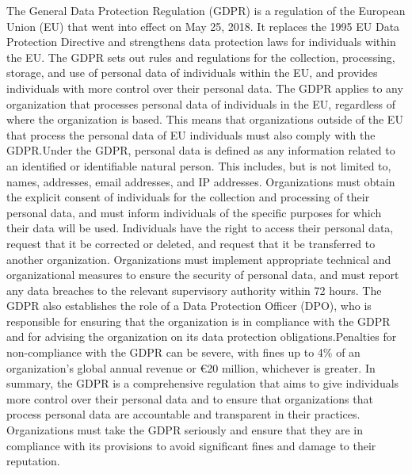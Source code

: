\documentclass[target=mst,aauheader=]{thud}
\begin{document}
The General Data Protection Regulation (GDPR) is a regulation of the European Union (EU) that went into effect on May 25, 2018. It replaces the 1995 EU Data Protection Directive and strengthens data protection laws for individuals within the EU. The GDPR sets out rules and regulations for the collection, processing, storage, and use of personal data of individuals within the EU, and provides individuals with more control over their personal data.
The GDPR applies to any organization that processes personal data of individuals in the EU, regardless of where the organization is based. This means that organizations outside of the EU that process the personal data of EU individuals must also comply with the GDPR.Under the GDPR, personal data is defined as any information related to an identified or identifiable natural person. This includes, but is not limited to, names, addresses, email addresses, and IP addresses.
Organizations must obtain the explicit consent of individuals for the collection and processing of their personal data, and must inform individuals of the specific purposes for which their data will be used. Individuals have the right to access their personal data, request that it be corrected or deleted, and request that it be transferred to another organization.
Organizations must implement appropriate technical and organizational measures to ensure the security of personal data, and must report any data breaches to the relevant supervisory authority within 72 hours.
The GDPR also establishes the role of a Data Protection Officer (DPO), who is responsible for ensuring that the organization is in compliance with the GDPR and for advising the organization on its data protection obligations.Penalties for non-compliance with the GDPR can be severe, with fines up to 4\% of an organization's global annual revenue or €20 million, whichever is greater.
In summary, the GDPR is a comprehensive regulation that aims to give individuals more control over their personal data and to ensure that organizations that process personal data are accountable and transparent in their practices. Organizations must take the GDPR seriously and ensure that they are in compliance with its provisions to avoid significant fines and damage to their reputation.

\backmatter
\end{document}
